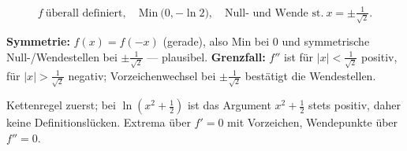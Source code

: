 \begin{ergebnis}
\begin{equation*}
  f\ \text{überall definiert},\quad
  \text{Min}\ \bigl(0,-\ln2\bigr),\quad
  \text{Null- und Wende st.}\ x=\pm\tfrac{1}{\sqrt2}.
\end{equation*}
\end{ergebnis}

\begin{kontrolle}
\textbf{Symmetrie:} $f(x)=f(-x)$ (gerade), also Min bei $0$ und symmetrische
Null-/Wendestellen bei $\pm\tfrac1{\sqrt2}$ — plausibel.
\textbf{Grenzfall:} $f''$ ist für $|x|<\tfrac1{\sqrt2}$ positiv, für
$|x|>\tfrac1{\sqrt2}$ negativ; Vorzeichenwechsel bei $\pm\tfrac1{\sqrt2}$
bestätigt die Wendestellen.
\end{kontrolle}

\begin{merksatz}
Kettenregel zuerst; bei $\ln(x^2+\tfrac12)$ ist das Argument $x^2+\tfrac12$
stets positiv, daher keine Definitionslücken. Extrema über $f'=0$ mit
Vorzeichen, Wendepunkte über $f''=0$.
\end{merksatz}
